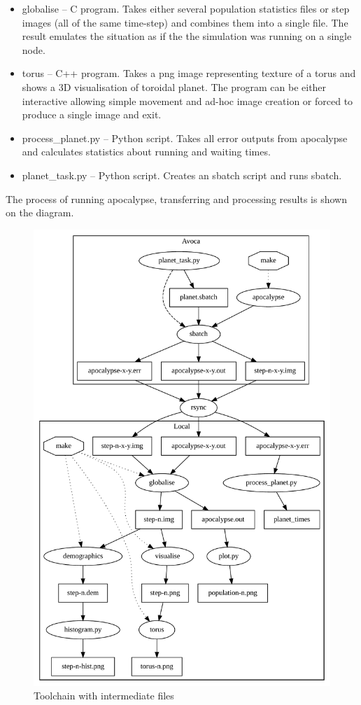 \documentclass[a4paper]{article}
\begin{document}
\begin{itemize}
\item globalise -- C program. Takes either several population statistics files or step images (all of the same time-step) and combines them into a single file.
    The result emulates the situation as if the the simulation was running on a single node.
\item torus -- C++ program. Takes a png image representing texture of a torus and shows a 3D visualisation of toroidal planet.
    The program can be either interactive allowing simple movement and ad-hoc image creation or forced to produce a single image and exit.
\item process\_planet.py -- Python script. Takes all error outputs from apocalypse and calculates statistics about running and waiting times.
\item planet\_task.py -- Python script. Creates an sbatch script and runs sbatch. 
\end{itemize}

The process of running apocalypse, transferring and processing results is shown on the diagram.

\begin{figure}[pht]
    \centering
    \includegraphics[width=\textwidth]{toolchain}
    \caption{Toolchain with intermediate files}
\end{figure}
\end{document}
